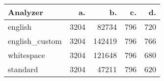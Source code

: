 \begin{tabular}{lrrrr}
\toprule
       Analyzer &    a. &      b. &   c. &   d. \\
\midrule
        english &  3204 &   82734 &  796 &  720 \\
 english\_custom &  3204 &  142419 &  796 &  766 \\
     whitespace &  3204 &  121648 &  796 &  680 \\
       standard &  3204 &   47211 &  796 &  620 \\
\bottomrule
\end{tabular}
